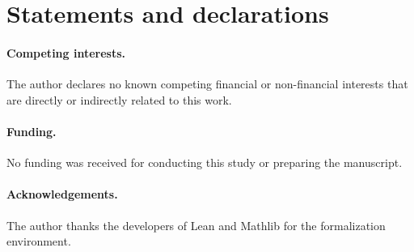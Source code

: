 \documentclass[11pt]{amsart}
\theoremstyle{definition}
\begin{document}
\section*{Statements and declarations}

\paragraph{Competing interests.}
The author declares no known competing financial or non-financial interests
that are directly or indirectly related to this work.

\paragraph{Funding.}
No funding was received for conducting this study or preparing the manuscript.

\paragraph{Acknowledgements.}
The author thanks the developers of Lean and Mathlib for the formalization
environment.

\enlargethispage{8\baselineskip}


\end{document}
